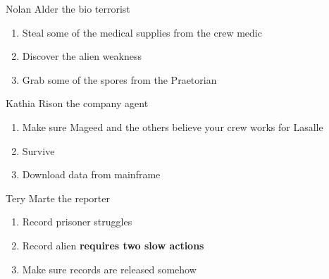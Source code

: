 \begin{rpg-commentbox}{Nolan Alder the  bio terrorist}
    \begin{enumerate}[label=\textbf{Act \arabic*}, leftmargin=1cm]
        \item Steal some of the medical supplies from the crew medic
        \item Discover the alien weakness
        \item Grab some of the spores from the Praetorian
    \end{enumerate}
\end{rpg-commentbox}

\newsect

\begin{rpg-commentbox}{Kathia Rison the company agent}
    \begin{enumerate}[label=\textbf{Act \arabic*}, leftmargin=1cm]
        \item Make sure Mageed and the others believe your crew works for Lasalle
        \item Survive
        \item Download data from mainframe
    \end{enumerate}
    
\end{rpg-commentbox}


\begin{rpg-commentbox}{Tery Marte the reporter}
    \begin{enumerate}[label=\textbf{Act \arabic*}, leftmargin=1cm]
        \item Record prisoner struggles
        \item Record alien \textbf{requires two slow actions}
        \item Make sure records are released somehow
    \end{enumerate}
\end{rpg-commentbox}








